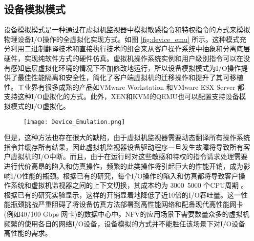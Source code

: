 \subsection{设备模拟模式}
设备模拟模式是一种通过在虚拟机监视器中模拟敏感指令和特权指令的方式来模拟物理设备I/O操作的全虚拟化实现方式。如图 \ref{fig:device_emu} 所示。这种模式充分利用二进制翻译技术和直接执行技术的组合来从客户操作系统中抽象和分离底层硬件，实现纯软件方式的硬件仿真。虚拟机操作系统实例和用户级别指令可以在没有感知底层虚拟化环境的情况下不加修改地运行，所以设备模拟模式为I/O操作提供了最佳性能隔离和安全性，简化了客户端虚拟机的迁移操作和提升了其可移植性。工业界有很多成熟的产品如VMware Workstation \cite{sugerman2001virtualizing} 和VMware ESX Server \cite{ahmad2003analysis} 都支持这种I/O虚拟化的方式。此外，XEN和KVM的QEMU也可以配置支持设备模拟模式的I/O虚拟化。
\begin{figure}[!htp]
	\centering
	\texttt{[image: Device\_Emulation.png]}
\end{figure}
但是，这种方法也存在很大的缺陷，由于虚拟机监视器需要动态翻译所有操作系统指令并缓存所有结果，因此虚拟机监视器设备驱动程序一旦发生故障将导致所有客户虚拟机的I/O中断。而且，由于在运行时对这些敏感和特权的指令请求处理需要进行代价高昂的陷入和仿真操作，频繁的此类操作将引起巨大的性能开销，成为影响I/O性能的瓶颈。根据已有的研究，每个I/O操作的陷入和仿真都将导致客户操作系统和虚拟机监视器之间的上下文切换，其成本约为 3000~5000 个CPU周期  。根据已有的研究实验显示，这样的开销显着地降低了近10倍的I/O吞吐量。这一性能瓶颈挑战严重阻碍了将设备仿真方法部署到高性能网络和配备现代高性能网卡(例如40/100 Gbps 网卡)的数据中心中。NFV的应用场景下需要数量众多的虚拟机频繁的使用各自的网络I/O设备，设备模拟的方式并不能胜任该场景下对I/O设备高性能的需求。

